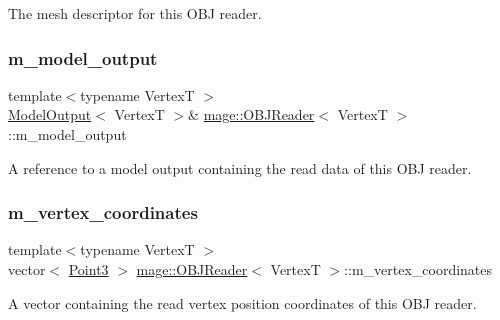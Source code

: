 The mesh descriptor for this O\+BJ reader. \hypertarget{classmage_1_1_o_b_j_reader_ad4691c59a3e3ecefd201a8f03528bbd8}{}\label{classmage_1_1_o_b_j_reader_ad4691c59a3e3ecefd201a8f03528bbd8} 
\subsubsection{\texorpdfstring{m\+\_\+model\+\_\+output}{m\_model\_output}}
{\footnotesize\ttfamily template$<$typename VertexT $>$ \\
\hyperlink{structmage_1_1_model_output}{Model\+Output}$<$ VertexT $>$\& \hyperlink{classmage_1_1_o_b_j_reader}{mage\+::\+O\+B\+J\+Reader}$<$ VertexT $>$\+::m\+\_\+model\+\_\+output\hspace{0.3cm}{\ttfamily [private]}}

A reference to a model output containing the read data of this O\+BJ reader. \hypertarget{classmage_1_1_o_b_j_reader_a1032eb4a6844a99f1d96fc17c3e52aee}{}\label{classmage_1_1_o_b_j_reader_a1032eb4a6844a99f1d96fc17c3e52aee} 
\subsubsection{\texorpdfstring{m\+\_\+vertex\+\_\+coordinates}{m\_vertex\_coordinates}}
{\footnotesize\ttfamily template$<$typename VertexT $>$ \\
vector$<$ \hyperlink{structmage_1_1_point3}{Point3} $>$ \hyperlink{classmage_1_1_o_b_j_reader}{mage\+::\+O\+B\+J\+Reader}$<$ VertexT $>$\+::m\+\_\+vertex\+\_\+coordinates\hspace{0.3cm}{\ttfamily [private]}}

A vector containing the read vertex position coordinates of this O\+BJ reader. \hypertarget{classmage_1_1_o_b_j_reader_a765e87afe7bd138dadcfc8c194311ed3}{}\label{classmage_1_1_o_b_j_reader_a765e87afe7bd138dadcfc8c194311ed3} 
